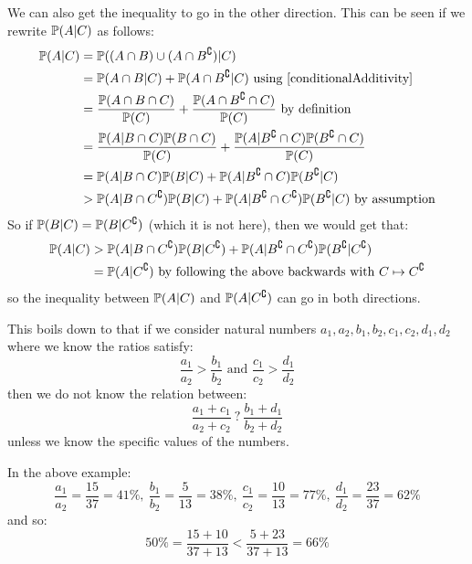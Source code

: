 \documentclass[../main.tex]{subfiles}
\begin{document}
\begin{example}
  We can also get the inequality to go in the other direction.
  This can be seen if we rewrite $\P(A \vert C)$ as follows:
  \begin{align*}
    \P(A \vert C) &= \P((A \cap B) \cup (A \cap B^{\comp}) \vert C)\\
                  &= \P(A \cap B \vert C) + \P(A \cap B^{\comp} \vert C) \text{ using \cref{conditionalAdditivity}} \\
                  &= \frac{\P(A \cap B \cap C)}{\P(C)} + \frac{\P(A \cap B^{\comp} \cap C)}{\P(C)} \text{ by definition} \\
                  &= \frac{\P(A \vert B \cap C)\P(B \cap C)}{\P(C)} + \frac{\P(A \vert B^{\comp} \cap C)\P(B^{\comp} \cap C)}{\P(C)} \\
                  &= \P(A \vert B \cap C)\P(B \vert C) + \P(A \vert B^{\comp} \cap C)\P(B^{\comp} \vert C) \\
                  &> \P(A \vert B \cap C^\comp)\P(B \vert C) + \P(A \vert B^{\comp} \cap C^\comp)\P(B^{\comp} \vert C) \text{ by assumption}
  \end{align*}
  So if $\P(B \vert C) = \P(B \vert C^\comp)$ (which it is not here), then we would get that:
  \begin{align*}
    \P(A \vert C) &> \P(A \vert B \cap C^\comp)\P(B \vert C^\comp) + \P(A \vert B^{\comp} \cap C^\comp)\P(B^{\comp} \vert C^\comp) \\
                  &= \P(A \vert C^\comp) \text{ by following the above backwards with $C \mapsto C^\comp$}
  \end{align*}
  so the inequality between $\P(A \vert C)$ and $\P(A \vert C^\comp)$ can go in both directions.

  This boils down to that if we consider natural numbers $a_1, a_2, b_1, b_2, c_1, c_2, d_1, d_2$ where we know the ratios satisfy:
  \[
    \frac{a_1}{a_2} > \frac{b_1}{b_2} \text{ and } \frac{c_1}{c_2} > \frac{d_1}{d_2}
  \]
  then we do not know the relation between:
  \[
    \frac{a_1 + c_1}{a_2 + c_2}\ ? \ \frac{b_1 + d_1}{b_2 + d_2}
  \]
  unless we know the specific values of the numbers.

  In the above example:
  \[
    \frac{a_1}{a_2} = \frac{15}{37} = 41\%,\ \frac{b_1}{b_2} = \frac{5}{13} = 38\%,\ \frac{c_1}{c_2} = \frac{10}{13} = 77\%,\ \frac{d_1}{d_2} = \frac{23}{37} = 62\%
  \]
  and so:
  \[
    50\% = \frac{15 + 10}{37 + 13} < \frac{5 + 23}{37 + 13} = 66\%
  \]
\end{example}
\end{document}
